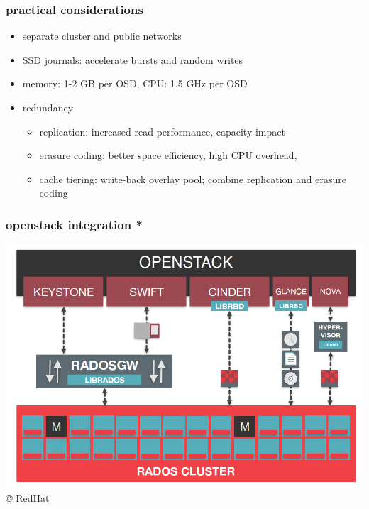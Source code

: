\documentclass[10pt, compress]{beamer}
\begin{document}
\newcommand\redsout{\bgroup\markoverwith{\textcolor{red}{\rule[0.5ex]{2pt}{0.4pt}}}\ULon}

\begin{frame}[fragile]
    \frametitle{practical considerations}
    \begin{itemize}
        \item separate cluster and public networks
        \item SSD journals: accelerate bursts and random writes
        \item memory: 1-2 GB per OSD, CPU: 1.5 GHz per OSD
        \item redundancy
            \begin{itemize}
                \item replication: increased read performance, capacity impact
                \item erasure coding: better space efficiency, high CPU 
                    overhead, \redsout{RBD}
                \item cache tiering: write-back overlay pool; combine 
                    replication and erasure coding
        \end{itemize}
    \end{itemize}
\end{frame}

\begin{frame}[fragile]
    \frametitle{openstack integration *}
    \begin{center}
        \includegraphics[width=.8\textwidth]{ceph-openstack}\\
        \fontsize{5}{5}\selectfont  
        \href{http://chianingwang.blogspot.de/2015/01/my-first-ceph-lab-note.html}{\copyright 
        RedHat}
    \end{center}
\end{frame}
\end{document}
